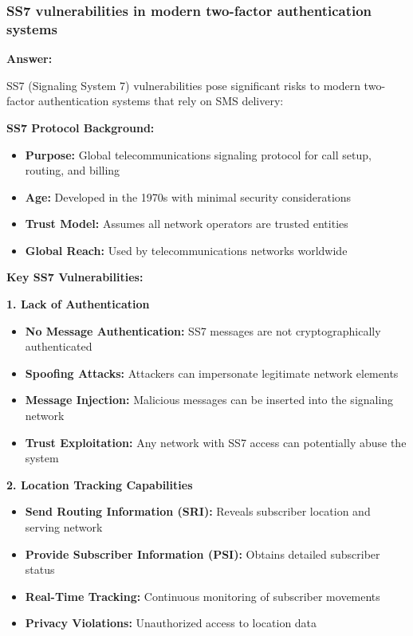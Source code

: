 \documentclass[12pt,a4paper]{article}
\begin{document}
\subsubsection{SS7 vulnerabilities in modern two-factor authentication systems}

\textbf{Answer:}

SS7 (Signaling System 7) vulnerabilities pose significant risks to modern two-factor authentication systems that rely on SMS delivery:

\textbf{SS7 Protocol Background:}
\begin{itemize}
    \item \textbf{Purpose:} Global telecommunications signaling protocol for call setup, routing, and billing
    \item \textbf{Age:} Developed in the 1970s with minimal security considerations
    \item \textbf{Trust Model:} Assumes all network operators are trusted entities
    \item \textbf{Global Reach:} Used by telecommunications networks worldwide
\end{itemize}

\textbf{Key SS7 Vulnerabilities:}

\textbf{1. Lack of Authentication}
\begin{itemize}
    \item \textbf{No Message Authentication:} SS7 messages are not cryptographically authenticated
    \item \textbf{Spoofing Attacks:} Attackers can impersonate legitimate network elements
    \item \textbf{Message Injection:} Malicious messages can be inserted into the signaling network
    \item \textbf{Trust Exploitation:} Any network with SS7 access can potentially abuse the system
\end{itemize}

\textbf{2. Location Tracking Capabilities}
\begin{itemize}
    \item \textbf{Send Routing Information (SRI):} Reveals subscriber location and serving network
    \item \textbf{Provide Subscriber Information (PSI):} Obtains detailed subscriber status
    \item \textbf{Real-Time Tracking:} Continuous monitoring of subscriber movements
    \item \textbf{Privacy Violations:} Unauthorized access to location data
\end{itemize}
\end{document}
